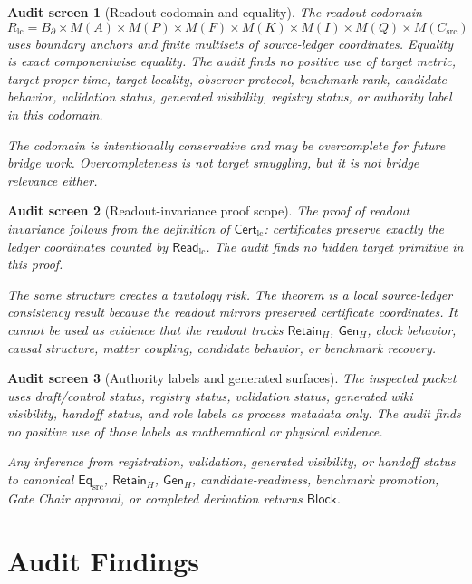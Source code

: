 \documentclass[11pt]{article}
\newcommand{\EqSrc}{\mathsf{Eq}_{\mathrm{src}}}
\newcommand{\CertLC}{\mathsf{Cert}_{\mathrm{lc}}}
\newcommand{\ReadLC}{\mathsf{Read}_{\mathrm{lc}}}
\newcommand{\RetainH}{\mathsf{Retain}_{H}}
\newcommand{\GenH}{\mathsf{Gen}_{H}}
\newcommand{\Block}{\mathsf{Block}}
\newtheorem{screen}{Audit screen}
\begin{document}
\begin{screen}[Readout codomain and equality]
The readout codomain
\[
    R_{\mathrm{lc}} =
    B_{\partial}\times M(A)\times M(P)\times M(F)\times
    M(K)\times M(I)\times M(Q)\times M(C_{\mathrm{src}})
\]
uses boundary anchors and finite multisets of source-ledger
coordinates. Equality is exact componentwise equality. The audit finds
no positive use of target metric, target proper time, target locality,
observer protocol, benchmark rank, candidate behavior, validation
status, generated visibility, registry status, or authority label in
this codomain.

The codomain is intentionally conservative and may be overcomplete for
future bridge work. Overcompleteness is not target smuggling, but it is
not bridge relevance either.
\end{screen}

\begin{screen}[Readout-invariance proof scope]
The proof of readout invariance follows from the definition of
\(\CertLC\): certificates preserve exactly the ledger coordinates
counted by \(\ReadLC\). The audit finds no hidden target primitive in
this proof.

The same structure creates a tautology risk. The theorem is a local
source-ledger consistency result because the readout mirrors preserved
certificate coordinates. It cannot be used as evidence that the
readout tracks \(\RetainH\), \(\GenH\), clock behavior, causal
structure, matter coupling, candidate behavior, or benchmark recovery.
\end{screen}

\begin{screen}[Authority labels and generated surfaces]
The inspected packet uses draft/control status, registry status,
validation status, generated wiki visibility, handoff status, and role
labels as process metadata only. The audit finds no positive use of
those labels as mathematical or physical evidence.

Any inference from registration, validation, generated visibility, or
handoff status to canonical \(\EqSrc\), \(\RetainH\), \(\GenH\),
candidate-readiness, benchmark promotion, Gate Chair approval, or
completed derivation returns \(\Block\).
\end{screen}

\section{Audit Findings}
\end{document}
